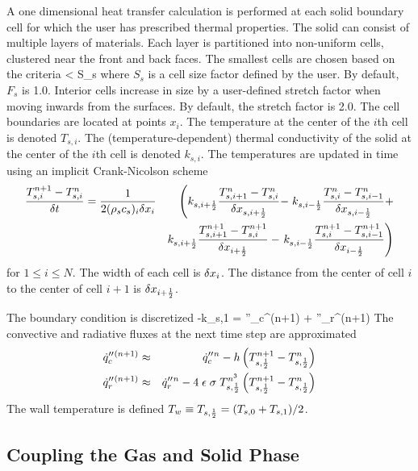 \documentclass[11pt]{book}
\begin{document}
A one dimensional heat transfer calculation is performed at each solid
boundary cell for which the user has prescribed thermal
properties. The solid can consist of multiple layers of materials.
Each layer is partitioned into non-uniform cells, clustered near the
front and back faces.  The smallest cells are chosen based on the
criteria
\be \dx < S_s \ee
where $S_s$ is a cell size factor defined by the user. By default,
$F_s$ is 1.0.  Interior cells increase in size by a user-defined
stretch factor when moving inwards from the surfaces. By default, the
stretch factor is 2.0. The cell boundaries are located at points
$x_i$. The temperature at the center of the $i$th cell is denoted $T_{s,i}$.
The (temperature-dependent) thermal conductivity of the solid
at the center of the $i$th cell is denoted $k_{s,i}$.
The temperatures are updated in time using an implicit
Crank-Nicolson scheme
\begin{eqnarray}
    \frac{T_{s,i}^{n+1}-T_{s,i}^n}{\delta t} = \frac{1}{2 (\rho_s c_s)_i \delta x_{i} }
& & \left(
    k_{s,i+\frac{1}{2}}\frac{T_{s,i+1}^n-T_{s,i}^n}{\delta x_{s,i+\frac{1}{2}}} - \right.
    k_{s,i-\frac{1}{2}}\frac{T_{s,i}^n-T_{s,i-1}^n}{\delta x_{s,i-\frac{1}{2}}} +  \nonumber \\
& & k_{s,i+\frac{1}{2}}\frac{T_{s,i+1}^{n+1}-T_{s,i}^{n+1}}{\delta x_{i+\frac{1}{2}}} -
    \left.
    k_{s,i-\frac{1}{2}}\frac{T_{s,i}^{n+1}-T_{s,i-1}^{n+1}}{\delta x_{i-\frac{1}{2}}}
     \right) \end{eqnarray}
for $1 \le i \le N$.
The width of each cell is $\delta x_i$. The distance from the center of cell $i$ to the center
of cell $i+1$ is $\delta x_{i+\frac{1}{2}}$.

The boundary condition is discretized
\be -k_{s,1}  = \dq''_c{}^{(n+1)} + \dq''_r{}^{(n+1)} \ee
The convective and radiative fluxes at the next time step are approximated
\begin{eqnarray}
\dot{q}''_c{}^{(n+1)} &\approx& \dot{q}''_c{}^n - h\left( T_{s,\frac{1}{2}}^{n+1} - T_{s,\frac{1}{2}}^n \right) \\
\dot{q}''_r{}^{(n+1)} &\approx& \dot{q}''_r{}^n - 4 \; \epsilon \; \sigma \; T_{s,\frac{1}{2}}^{n^3} \left(
  T_{s,\frac{1}{2}}^{n+1} - T_{s,\frac{1}{2}}^n \right)  \end{eqnarray}
The wall temperature is defined $T_w \equiv T_{s,\frac{1}{2}}=(T_{s,0}+T_{s,1})/2$.


\subsection{Coupling the Gas and Solid Phase}
\end{document}
